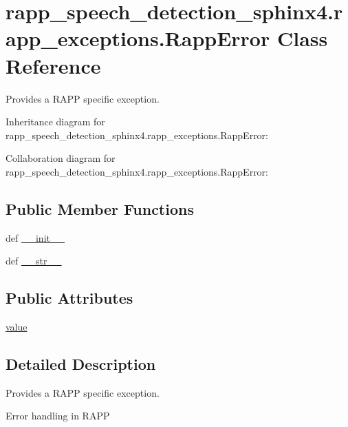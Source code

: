 \hypertarget{classrapp__speech__detection__sphinx4_1_1rapp__exceptions_1_1RappError}{\section{rapp\-\_\-speech\-\_\-detection\-\_\-sphinx4.\-rapp\-\_\-exceptions.\-Rapp\-Error Class Reference}
\label{classrapp__speech__detection__sphinx4_1_1rapp__exceptions_1_1RappError}
}


Provides a R\-A\-P\-P specific exception.  




Inheritance diagram for rapp\-\_\-speech\-\_\-detection\-\_\-sphinx4.\-rapp\-\_\-exceptions.\-Rapp\-Error\-:


Collaboration diagram for rapp\-\_\-speech\-\_\-detection\-\_\-sphinx4.\-rapp\-\_\-exceptions.\-Rapp\-Error\-:
\subsection*{Public Member Functions}
\begin{DoxyCompactItemize}
\item 
def \hyperlink{classrapp__speech__detection__sphinx4_1_1rapp__exceptions_1_1RappError_a96920fb0892c1070dc41c2d19a4d7535}{\-\_\-\-\_\-init\-\_\-\-\_\-}
\item 
def \hyperlink{classrapp__speech__detection__sphinx4_1_1rapp__exceptions_1_1RappError_aebed65d2df9d94ed1bd8f5c30b86a469}{\-\_\-\-\_\-str\-\_\-\-\_\-}
\end{DoxyCompactItemize}
\subsection*{Public Attributes}
\begin{DoxyCompactItemize}
\item 
\hyperlink{classrapp__speech__detection__sphinx4_1_1rapp__exceptions_1_1RappError_a2315c4cb6ee5f5681844294e1ac4c544}{value}
\end{DoxyCompactItemize}


\subsection{Detailed Description}
Provides a R\-A\-P\-P specific exception. 

\begin{DoxyVerb}Error handling in RAPP\end{DoxyVerb}
 

